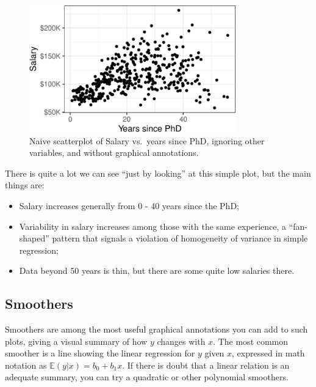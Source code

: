 \documentclass[
  letterpaper,
  10pt,
  krantz2]{krantz}
\providecommand{\tightlist}{%
  \setlength{\itemsep}{0pt}\setlength{\parskip}{0pt}}\usepackage{longtable,booktabs,array}
\begin{document}
\begin{figure}[H]

{\centering \includegraphics[width=0.8\textwidth,height=\textheight]{figs/ch03/fig-Salaries-scat-1.pdf}

}

\caption{\label{fig-Salaries-scat}Naive scatterplot of Salary vs.~years
since PhD, ignoring other variables, and without graphical annotations.}

\end{figure}

There is quite a lot we can see ``just by looking'' at this simple plot,
but the main things are:

\begin{itemize}
\tightlist
\item
  Salary increases generally from 0 - 40 years since the PhD;
\item
  Variability in salary increases among those with the same experience,
  a ``fan-shaped'' pattern that signals a violation of homogeneity of
  variance in simple regression;
\item
  Data beyond 50 years is thin, but there are some quite low salaries
  there.
\end{itemize}

\hypertarget{smoothers}{%
\subsection{Smoothers}\label{smoothers}}

Smoothers are among the most useful graphical annotations you can add to
such plots, giving a visual summary of how \(y\) changes with \(x\). The
most common smoother is a line showing the linear regression for \(y\)
given \(x\), expressed in math notation as
\(\mathbb{E} (y | x) = b_0 + b_1 x\). If there is doubt that a linear
relation is an adequate summary, you can try a quadratic or other
polynomial smoothers.
\end{document}
